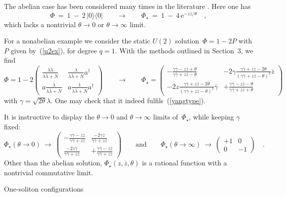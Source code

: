 \documentclass[a4paper,11pt]{article}
\makeatletter
\renewcommand{\section}{\@startsection{section}{1}{0pt}{\medskipamount}
{\medskipamount}{\large\bf}}
\numberwithin{equation}{section}
\def\g{\gamma}
\def\th{\theta}
\def\l{\lambda}
\def\e{\mbox{e}}
\newcommand{\adag}{a^{\dagger}}
\newcommand{\gb}{\overline{\gamma}}
\newcommand{\lb}{\overline{\lambda}}
\newcommand{\zb}{\overline{z}}
\makeatother
\begin{document}
The abelian case has been considered many times in the literature
\cite{gopa,aga,harvey,komaba}. Here one has
\begin{equation} \label{abelex}
\Phi\ =\ 1\ -\ 2\,|0\rangle\langle0|
\qquad\longrightarrow\qquad
\Phi_\star\ =\ 1\ -\ 4\,\e^{-z\zb/\th} \quad,
\end{equation}
which lacks a nontrivial $\th{\to}0$ or $\th{\to}\infty$ limit.

For a nonabelian example we consider the static $U(2)$ solution~$\Phi=1-2P$
with $P$ given by~(\ref{u2ex}), for degree $q{=}1$.
With the methods outlined in Section~3, we find
\begin{equation} \label{u2ex2}
\Phi = 1 - 2\left(\begin{matrix}
\frac{\l\lb}{\l\lb+N} & \frac{\l}{\l\lb+N}\adag \\[10pt]
a\frac{\lb}{\l\lb+N} & a\frac{1}{\l\lb+N}\adag
\end{matrix}\right)
\qquad\longrightarrow\qquad
\Phi_\star = \left(\begin{matrix}
-\frac{\g\gb-z\zb+\th}{\g\gb+z\zb-\th} &
-2\g\frac{\g\gb+z\zb-2\th}{(\g\gb+z\zb-\th)^2}\zb \\[10pt]
-2 z\frac{\g\gb+z\zb-2\th}{(\g\gb+z\zb-\th)^2}\gb &
+\frac{\g\gb-z\zb-\th}{\g\gb+z\zb+\th}
\end{matrix}\right)
\end{equation}
with $\g=\sqrt{2\th}\l$.
One may check that it indeed fulfils~(\ref{yangtype}).

It is instructive to display the $\th\to0$ and $\th\to\infty$ limits
of~$\Phi_\star$, while keeping $\g$ fixed:
\begin{equation}
\Phi_\star(\th{\to}0)\ \to\ \left(\begin{matrix}
-\frac{\g\gb-z\zb}{\g\gb+z\zb} & \frac{-2\g\zb}{\g\gb+z\zb} \\[10pt]
 \frac{-2z\gb}{\g\gb+z\zb} & +\frac{\g\gb-z\zb}{\g\gb+z\zb}
\end{matrix}\right) \qquad\textrm{and}\qquad
\Phi_\star(\th{\to}\infty)\ \to\ \left(\begin{matrix}
+1 & 0 \\[10pt] 0 & -1 \end{matrix}\right) \quad.
\end{equation}
Other than the abelian solution, $\Phi_\star(z,\zb,\th)$ is a
rational function with a nontrivial commutative limit.

\section{One-soliton configurations}
\end{document}
